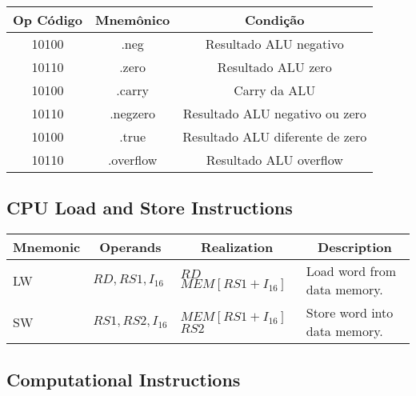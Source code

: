 \documentclass{article}
\begin{document}
    
    \begin{table}[H]
      \begin{center}
        \begin{tabular}[pos]{|c|c|c|} 
        \hline
			\cellcolor[gray]{0.9}\textbf{Op Código} & \cellcolor[gray] {0.9}\textbf{Mnemônico} & \cellcolor[gray] {0.9}\textbf{Condição} \\ \hline    		
           10100 &	.neg & Resultado ALU negativo\\ \hline
		   10110 &    	.zero & 	Resultado ALU zero \\ \hline
           10100 &	.carry & Carry da ALU\\ \hline
		   10110 &    	.negzero & 	Resultado ALU negativo ou zero \\ \hline
           10100 &	.true & Resultado ALU diferente de zero\\ \hline
		   10110 &    	.overflow & 	Resultado ALU overflow \\ \hline
    	\end{tabular}
      \end{center}
    \end{table}
  
  \subsection{CPU Load and Store Instructions}
  
 \FloatBarrier
  \begin{table}[H]
    \begin{center}
      \label{tab:load_store_instructions}
      \begin{tabular}[pos]{| l | l | l | l |} \hline 	
      \multicolumn{1}{|c|}{\cellcolor[gray]{0.9}\textbf{Mnemonic}} &
      \multicolumn{1}{c|}{\cellcolor[gray]{0.9}\textbf{Operands}} &  
      \multicolumn{1}{c|}{\cellcolor[gray]{0.9}\textbf{Realization}} &
      \multicolumn{1}{c|}{\cellcolor[gray]{0.9}\textbf{Description}} \\ \hline
	LW  & $RD,RS1,I_{16}$ & $RD$ \textleftarrow $MEM[RS1+I_{16}]$ & Load word from data memory.	\\ \hline
	SW  & $RS1,RS2,I_{16}$ & $MEM[RS1+I_{16}]$ \textleftarrow $RS2$ & Store word into data memory. 		\\ \hline
      \end{tabular}
    \end{center}
  \end{table}  
  
  
  \subsection{Computational Instructions}
  
\end{document}
